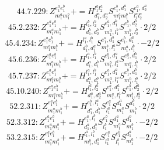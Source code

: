 \documentclass[letterpaper,10pt,fleqn,leqno,onecolumn]{article}
\begin{document}
\begin{equation} \;\;\;\;\;\;  44.7.229: Z^{e_{1}^{a}e_{1}^{b}}_{m_{1}^{a}m_{1}^{b}}+=H^{l_{1}^{a}l_{2}^{a}}_{d_{1}^{a},d_{2}^{a}}S^{e_{1}^{b},d_{1}^{a}}_{m_{1}^{a}m_{1}^{b}}S^{e_{1}^{a},d_{2}^{a}}_{l_{1}^{a}l_{2}^{a}} \end{equation}
\begin{equation} \;\;\;\;\;\;  45.2.232: Z^{e_{1}^{a}e_{1}^{b}}_{m_{1}^{a}m_{1}^{b}}+=H^{l_{1}^{b},l_{2}^{b}}_{d_{1}^{b},d_{2}^{b}}S^{e_{1}^{a},d_{1}^{b}}_{m_{1}^{a},l_{1}^{b}}S^{e_{1}^{b},d_{2}^{b}}_{m_{1}^{b},l_{2}^{b}}\cdot 2/2 \end{equation}
\begin{equation} \;\;\;\;\;\;  45.4.234: Z^{e_{1}^{a}e_{1}^{b}}_{m_{1}^{a}m_{1}^{b}}+=H^{l_{1}^{a},l_{1}^{b}}_{d_{1}^{b},d_{1}^{a}}S^{e_{1}^{a},d_{1}^{b}}_{m_{1}^{b},l_{1}^{a}}S^{e_{1}^{b},d_{1}^{a}}_{m_{1}^{a},l_{1}^{b}}\cdot -2/2 \end{equation}
\begin{equation} \;\;\;\;\;\;  45.6.236: Z^{e_{1}^{a}e_{1}^{b}}_{m_{1}^{a}m_{1}^{b}}+=H^{l_{1}^{a},l_{1}^{b}}_{d_{1}^{a},d_{1}^{b}}S^{e_{1}^{b},d_{1}^{a}}_{m_{1}^{b},l_{1}^{a}}S^{e_{1}^{a},d_{1}^{b}}_{m_{1}^{a},l_{1}^{b}}\cdot 2/2 \end{equation}
\begin{equation} \;\;\;\;\;\;  45.7.237: Z^{e_{1}^{a}e_{1}^{b}}_{m_{1}^{a}m_{1}^{b}}+=H^{l_{1}^{a},l_{1}^{b}}_{d_{1}^{a},d_{1}^{b}}S^{e_{1}^{a},d_{1}^{a}}_{m_{1}^{a},l_{1}^{a}}S^{e_{1}^{b},d_{1}^{b}}_{m_{1}^{b},l_{1}^{b}}\cdot 2/2 \end{equation}
\begin{equation} \;\;\;\;\;\;  45.10.240: Z^{e_{1}^{a}e_{1}^{b}}_{m_{1}^{a}m_{1}^{b}}+=H^{l_{1}^{a},l_{2}^{a}}_{d_{1}^{a},d_{2}^{a}}S^{e_{1}^{a},d_{1}^{a}}_{m_{1}^{a},l_{1}^{a}}S^{e_{1}^{b},d_{2}^{a}}_{m_{1}^{b},l_{2}^{a}}\cdot 2/2 \end{equation}
\begin{equation} \;\;\;\;\;\;  52.2.311: Z^{e_{1}^{a}e_{1}^{b}}_{m_{1}^{a}m_{1}^{b}}+=H^{e_{1}^{b},l_{1}^{a}}_{d_{1}^{a},d_{1}^{b}}S^{e_{1}^{a}}_{l_{1}^{a}}S^{d_{1}^{a}}_{m_{1}^{a}}S^{d_{1}^{b}}_{m_{1}^{b}}\cdot 2/2 \end{equation}
\begin{equation} \;\;\;\;\;\;  52.3.312: Z^{e_{1}^{a}e_{1}^{b}}_{m_{1}^{a}m_{1}^{b}}+=H^{e_{1}^{a},l_{1}^{b}}_{d_{1}^{a},d_{1}^{b}}S^{e_{1}^{b}}_{l_{1}^{b}}S^{d_{1}^{a}}_{m_{1}^{a}}S^{d_{1}^{b}}_{m_{1}^{b}}\cdot -2/2 \end{equation}
\begin{equation} \;\;\;\;\;\;  53.2.315: Z^{e_{1}^{a}e_{1}^{b}}_{m_{1}^{a}m_{1}^{b}}+=H^{l_{1}^{a},l_{1}^{b}}_{m_{1}^{b},d_{1}^{a}}S^{e_{1}^{a}}_{l_{1}^{a}}S^{e_{1}^{b}}_{l_{1}^{b}}S^{d_{1}^{a}}_{m_{1}^{a}}\cdot -2/2 \end{equation}
\end{document}
